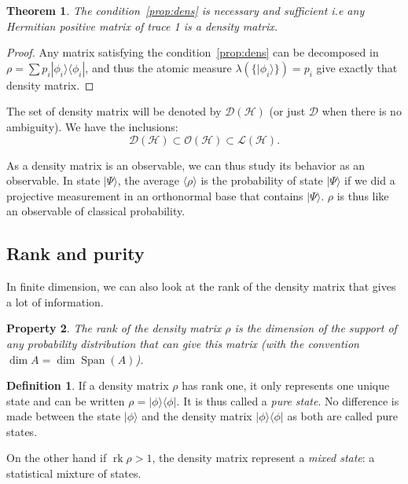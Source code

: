 \documentclass[10pt,a4paper]{report}
\theoremstyle{plain}
\newtheorem{thm}{Theorem}[chapter]
\newtheorem{prop}[thm]{Property}
\theoremstyle{definition}
\newtheorem{defn}{Definition}[chapter]
\theoremstyle{remark}
\newcommand{\ket}[1]{|#1\rangle}
\newcommand{\bra}[1]{\langle#1|}
\DeclareMathOperator{\rk}{rk}
\DeclareMathOperator{\Span}{Span}
\begin{document}
\begin{thm} The condition~\ref{prop:dens} is necessary and sufficient i.e any
  Hermitian positive matrix of trace 1 is a density matrix.
\end{thm}

\begin{proof}
  Any matrix satisfying the condition~\ref{prop:dens} can be decomposed in
  $\rho = \sum p_i \ket {\phi_i} \bra {\phi_i}$, and thus the atomic measure
  $\lambda(\{\ket {\phi_i}\}) = p_i$ give exactly that density matrix.
\end{proof}

The set of density matrix will be denoted by $\mathcal{D}(\mathcal{H})$ (or just
$\mathcal{D}$ when there is no ambiguity). We have the inclusions:
\[\mathcal{D}(\mathcal{H}) \subset \mathcal{O}(\mathcal{H}) \subset \mathcal{L}(\mathcal{H}).\]

As a density matrix is an observable, we can thus study its behavior as an observable.
In state $\ket \Psi$, the average $\langle \rho \rangle$ is the probability of
state $\ket \Psi$ if we did a projective measurement in an orthonormal base that
contains $\ket \Psi$. $\rho$ is thus like an observable of classical probability.

\subsection{Rank and purity}

In finite dimension, we can also look at the
rank of the density matrix that gives a lot of information.

\begin{prop}
  The rank of the density matrix $\rho$ is the dimension of the support of any
  probability distribution that can give this matrix
  (with the convention $\dim A = \dim \Span(A)$).
\end{prop}

\begin{defn}
  If a density matrix $\rho$ has rank one, it only represents one unique state and can be written
  $\rho = \ket \phi \bra \phi$. It is thus called a \emph{pure state}. No
  difference is made between the state $\ket \phi$ and the density matrix $\ket
  \phi \bra \phi$ as both are called pure states.

  On the other hand if $\rk \rho > 1$, the density matrix represent a
  \emph{mixed state}: a statistical mixture of states.
\end{defn}
\end{document}
